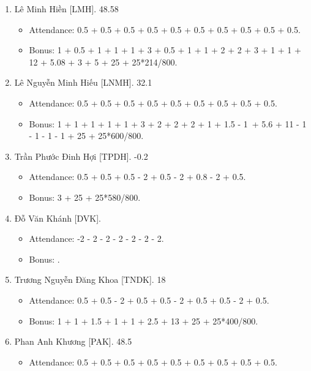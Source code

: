 \documentclass{article}
\begin{document}
\begin{enumerate}
\begin{itemize}
        \item Bonus: 0.5 + 1.5 + 3 + 1 - 0.5 + 1 + 2 + 2 + 2 + 3 - 1 + 1 + 1 + 2 + 13 + 1.48 + 3 + 5 - 1 + 25 + 25*589/800.
    \end{itemize}
    \item {\sc Lê Minh Hiền [LMH].} 48.58
    \begin{itemize}
        \item Attendance: 0.5 + 0.5 + 0.5 + 0.5 + 0.5 + 0.5 + 0.5 + 0.5 + 0.5 + 0.5.
        \item Bonus: 1 + 0.5 + 1 + 1 + 1 + 3 + 0.5 + 1 + 1 + 2 + 2 + 3 + 1 + 1 + 12 + 5.08 + 3 + 5 + 25 + 25*214/800.
    \end{itemize}
    \item {\sc Lê Nguyễn Minh Hiếu [LNMH].} 32.1
    \begin{itemize}
        \item Attendance: 0.5 + 0.5 + 0.5 + 0.5 + 0.5 + 0.5 + 0.5 + 0.5 + 0.5.
        \item Bonus: 1 + 1 + 1 + 1 + 1 + 3 + 2 + 2 + 2 + 1 + 1.5 - 1 + 5.6 + 11 - 1 - 1 - 1 - 1 + 25 + 25*600/800.
    \end{itemize}
    \item {\sc Trần Phước Đinh Hợi [TPDH].} -0.2
    \begin{itemize}
        \item Attendance: 0.5 + 0.5 + 0.5 - 2 + 0.5 - 2 + 0.8 - 2 + 0.5.
        \item Bonus: 3 + 25 + 25*580/800.
    \end{itemize}
    \item {\sc Đỗ Văn Khánh [DVK].}
    \begin{itemize}
        \item Attendance: -2 - 2 - 2 - 2 - 2 - 2 - 2.
        \item Bonus: .
    \end{itemize}
    \item {\sc Trương Nguyễn Đăng Khoa [TNDK].} 18
    \begin{itemize}
        \item Attendance: 0.5 + 0.5 - 2 + 0.5 + 0.5 - 2 + 0.5 + 0.5 - 2 + 0.5.
        \item Bonus: 1 + 1 + 1.5 + 1 + 1 + 2.5 + 13 + 25 + 25*400/800.
    \end{itemize}
    \item {\sc Phan Anh Khương [PAK].} 48.5
    \begin{itemize}
        \item Attendance: 0.5 + 0.5 + 0.5 + 0.5 + 0.5 + 0.5 + 0.5 + 0.5 + 0.5.

\end{itemize}
\end{enumerate}
\end{document}
